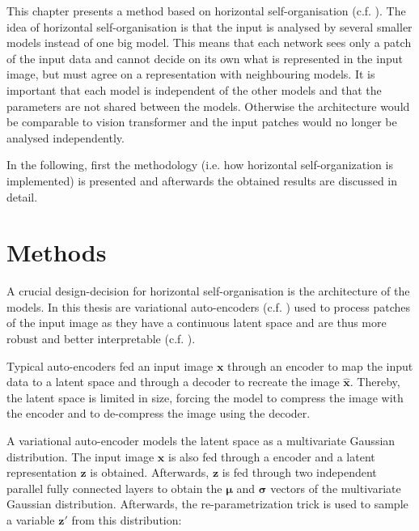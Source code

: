 This chapter presents a method based on horizontal self-organisation (c.f. ).
The idea of horizontal self-organisation is that the input is analysed by several smaller models instead of one big model.
This means that each network sees only a patch of the input data and cannot decide on its own what is represented in the input image, but must agree on a representation with neighbouring models.
It is important that each model is independent of the other models and that the parameters are not shared between the models. Otherwise the architecture would be comparable to vision transformer  and the input patches would no longer be analysed independently.


In the following, first the methodology (i.e. how horizontal self-organization is implemented) is presented and afterwards the obtained results are discussed in detail.


\section{Methods}
A crucial design-decision for horizontal self-organisation is the architecture of the models.
In this thesis are variational auto-encoders  (c.f. ) used to process patches of the input image as they have a continuous latent space and are thus more robust and better interpretable (c.f. ).

Typical auto-encoders fed an input image $\boldsymbol{x}$ through an encoder to map the input data to a latent space and through a decoder to recreate the image $\boldsymbol{\hat{x}}$. Thereby, the latent space is limited in size, forcing the model to compress the image with the encoder and to de-compress the image using the decoder.

A variational auto-encoder models the latent space as a multivariate Gaussian distribution. The input image $\boldsymbol{x}$ is also fed through a encoder and a latent representation $\boldsymbol{z}$ is obtained. Afterwards, $\boldsymbol{z}$ is fed through two independent parallel fully connected layers to obtain the $\boldsymbol{\mu}$ and $\boldsymbol{\sigma}$ vectors of the multivariate Gaussian distribution. Afterwards, the re-parametrization trick is used to sample a variable $\boldsymbol{z}'$ from this distribution:


